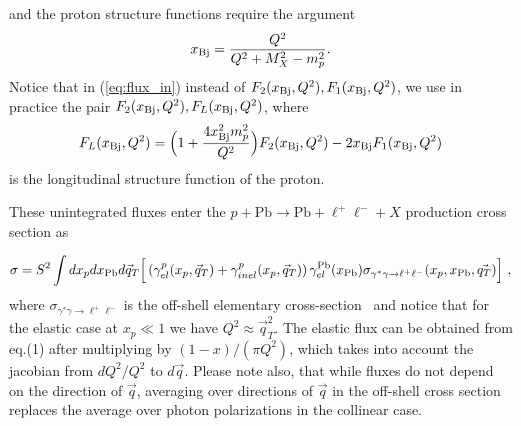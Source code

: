 and the proton structure functions require the argument
\begin{eqnarray}
x_{\rm Bj} = {Q^2 \over Q^2+M^2_X -m_p^2}.
\end{eqnarray}
Notice that in (\ref{eq:flux_in}) instead of 
$F_2(x_{\rm Bj},Q^2),F_1(x_{\rm Bj},Q^2)$, 
we use in practice the pair $F_2(x_{\rm Bj},Q^2),F_L(x_{\rm Bj},Q^2)$, where
\begin{eqnarray}
F_L(x_{\rm Bj},Q^2) = \Big( 1 + {4 x_{\rm Bj}^2 m_p^2 \over Q^2} \Big) F_2(x_{\rm Bj},Q^2) - 2 x_{\rm Bj} F_1(x_{\rm Bj},Q^2)
\end{eqnarray}
is the longitudinal structure function of the proton.

These unintegrated fluxes enter the $p+\textrm{Pb}\rightarrow \textrm{Pb} + \ell^+\ell^- + X$ production cross section as

\begin{equation}
\sigma = S^2 \int dx_p dx_{\rm Pb} d\vec{q}_T \Big[
\left ( \gamma^{p}_{el}(x_p, \vec{q}_T) + \gamma^{p}_{inel}(x_p,\vec{q}_T) \right)
 \gamma^{\rm Pb}_{el}(x_{\rm Pb})
\sigma_{\gamma^{*}  \gamma \rightarrow \ell^+ \ell^-}(x_p, x_{\rm Pb}, \vec{q_T})  \Big]~,
\label{kt_factorization_formula}
\end{equation}
%
where $\sigma_{\gamma^{*} \gamma \rightarrow \ell^+ \ell^-}$ is the off-shell elementary cross-section~\cite{daSilveira:2014jla} and 
notice that for the elastic case at $x_p \ll 1$ we have $Q^2 \approx \vec{q}_T^2$.
The elastic flux can be obtained from eq.(1) after multiplying by
$(1-x)/(\pi Q^2)$, which takes into account the jacobian from
$dQ^2/Q^2$ to $d\vec{q}$. Please note also, that while fluxes do not depend on the direction of $\vec{q}$, averaging over directions
of $\vec{q}$ in the off-shell cross section replaces the average over photon polarizations in the collinear case.
